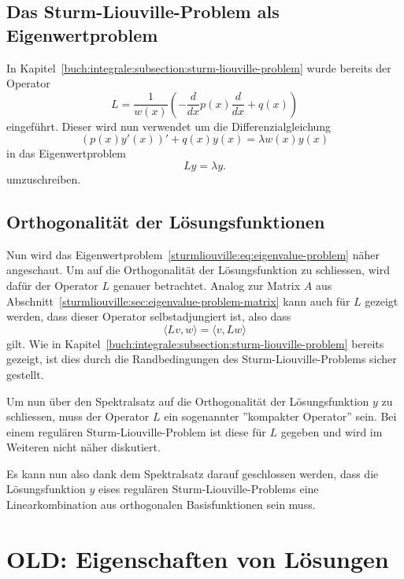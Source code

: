 \subsection{Das Sturm-Liouville-Problem als Eigenwertproblem}

In Kapitel~\ref{buch:integrale:subsection:sturm-liouville-problem} wurde bereits
der Operator
\[
    L
    =
    \frac{1}{w(x)}\left( -\frac{d}{dx}p(x) \frac{d}{dx} + q(x)\right)
\]
eingeführt.
Dieser wird nun verwendet um die Differenzialgleichung 
\[
    (p(x)y'(x))' + q(x)y(x)
    =
    \lambda w(x) y(x)
\]
in das Eigenwertproblem
\begin{equation}
    \label{sturmliouville:eq:eigenvalue-problem}
    L y
    =
    \lambda y.
\end{equation}
umzuschreiben.

\subsection{Orthogonalität der Lösungsfunktionen}

Nun wird das Eigenwertproblem~\eqref{sturmliouville:eq:eigenvalue-problem} näher
angeschaut.
Um auf die Orthogonalität der Lösungsfunktion zu schliessen, wird dafür der
Operator $L$ genauer betrachtet.
Analog zur Matrix $A$ aus 
Abschnitt~\ref{sturmliouville:sec:eigenvalue-problem-matrix} kann auch für
$L$ gezeigt werden, dass dieser Operator selbstadjungiert ist, also dass
\[
    \langle L v, w\rangle
    =
    \langle v, L w\rangle
\]
gilt.
Wie in Kapitel~\ref{buch:integrale:subsection:sturm-liouville-problem} bereits
gezeigt, ist dies durch die Randbedingungen des Sturm-Liouville-Problems
sicher gestellt.

Um nun über den Spektralsatz auf die Orthogonalität der Lösungsfunktion $y$ zu
schliessen, muss der Operator $L$ ein sogenannter ''kompakter Operator'' sein.
Bei einem regulären Sturm-Liouville-Problem ist diese für $L$ gegeben und wird
im Weiteren nicht näher diskutiert.

Es kann nun also dank dem Spektralsatz darauf geschlossen werden, dass die
Lösungsfunktion $y$ eises regulären Sturm-Liouville-Problems eine
Linearkombination aus orthogonalen Basisfunktionen sein muss.


\iffalse

\section{OLD: Eigenschaften von Lösungen
}

